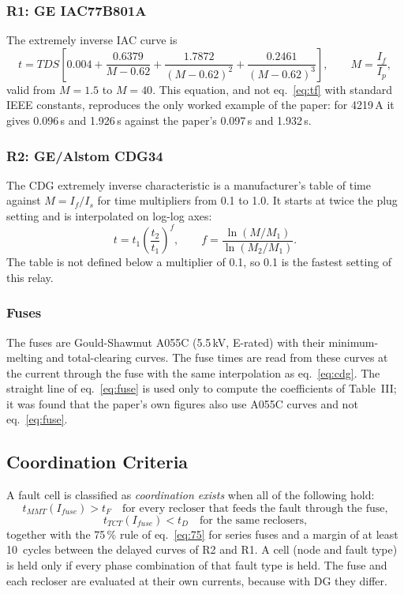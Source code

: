 \documentclass[12pt,letterpaper]{article}
\begin{document}
\subsubsection{R1: GE IAC77B801A}
The extremely inverse IAC curve is
\begin{equation}
t = TDS\left[0.004+\frac{0.6379}{M-0.62}+\frac{1.7872}{(M-0.62)^2}+\frac{0.2461}{(M-0.62)^3}\right],
\qquad M=\frac{I_f}{I_p},
\label{eq:iac}
\end{equation}
valid from $M=1.5$ to $M=40$. This equation, and not eq.~\eqref{eq:tf} with standard IEEE constants,
reproduces the only worked example of the paper: for 4219\,A it gives 0.096\,s and 1.926\,s against the
paper's 0.097\,s and 1.932\,s.

\subsubsection{R2: GE/Alstom CDG34}
The CDG extremely inverse characteristic is a manufacturer's table of time against $M=I_f/I_s$ for time
multipliers from 0.1 to 1.0. It starts at twice the plug setting and is interpolated on log-log axes:
\begin{equation}
t = t_1\left(\frac{t_2}{t_1}\right)^{f},\qquad f=\frac{\ln(M/M_1)}{\ln(M_2/M_1)} .
\label{eq:cdg}
\end{equation}
The table is not defined below a multiplier of 0.1, so 0.1 is the fastest setting of this relay.

\subsubsection{Fuses}
The fuses are Gould-Shawmut A055C (5.5\,kV, E-rated) with their minimum-melting and total-clearing curves.
The fuse times are read from these curves at the current through the fuse with the same interpolation as
eq.~\eqref{eq:cdg}. The straight line of eq.~\eqref{eq:fuse} is used only to compute the coefficients of
Table~III; it was found that the paper's own figures also use A055C curves and not eq.~\eqref{eq:fuse}.

\subsection{Coordination Criteria}
A fault cell is classified as \emph{coordination exists} when all of the following hold:
\begin{equation}
t_{MMT}(I_{fuse}) > t_F \quad\text{for every recloser that feeds the fault through the fuse,}
\label{eq:crit1}
\end{equation}
\begin{equation}
t_{TCT}(I_{fuse}) < t_D \quad\text{for the same reclosers,}
\label{eq:crit2}
\end{equation}
together with the 75\,\% rule of eq.~\eqref{eq:75} for series fuses and a margin of at least 10~cycles
between the delayed curves of R2 and R1. A cell (node and fault type) is held only if every phase
combination of that fault type is held. The fuse and each recloser are evaluated at their own currents,
because with DG they differ.
\end{document}
